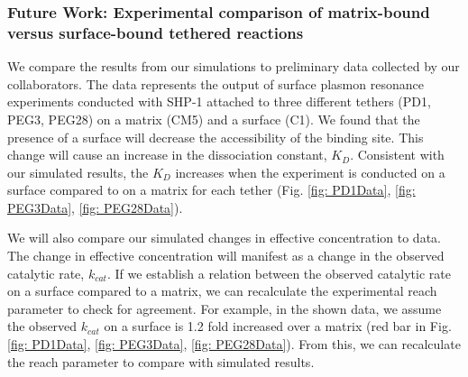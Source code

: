 \documentclass[../../AdvancementSummary.tex]{subfiles}
\begin{document}
%


\subsubsection{Future Work: Experimental comparison of matrix-bound versus surface-bound tethered reactions}


We compare the results from our simulations to preliminary data collected by our collaborators. The data represents the output of surface plasmon resonance experiments conducted with SHP-1 attached to three different tethers (PD1, PEG3, PEG28) on a matrix (CM5) and a surface (C1). 
We found that the presence of a surface will decrease the accessibility of the binding site. This change will cause an increase in the dissociation constant, $K_D$. 
Consistent with our simulated results, the $K_D$ increases when the experiment is conducted on a surface compared to on a matrix for each tether (Fig. \ref{fig: PD1Data}, \ref{fig: PEG3Data}, \ref{fig: PEG28Data}).

We will also compare our simulated changes in effective concentration to data. The change in effective concentration will manifest as a change in the observed catalytic rate, $k_{cat}$. 
If we establish a relation between the observed catalytic rate on a surface compared to a matrix, we can recalculate the experimental reach parameter to check for agreement. For example, in the shown data, we assume the observed $k_{cat}$ on a surface is 1.2 fold increased over a matrix (red bar in Fig. \ref{fig: PD1Data}, \ref{fig: PEG3Data}, \ref{fig: PEG28Data}). From this, we can recalculate the reach parameter to compare with simulated results. 
\end{document}
